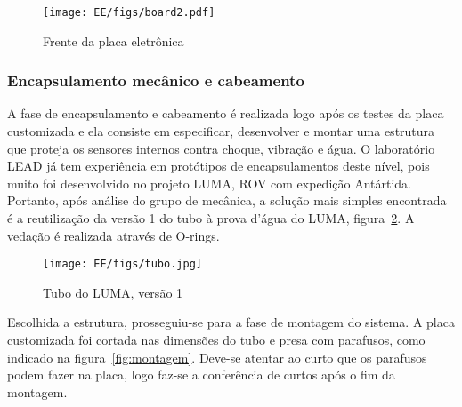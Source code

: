  \begin{figure}[H]
 \centering
 \texttt{[image: EE/figs/board2.pdf]}
 \caption{Frente da placa eletrônica}
 \label{fig:board2}
 \end{figure}

\subsubsection{Encapsulamento mecânico e cabeamento}
A fase de encapsulamento e cabeamento é realizada logo após os testes da placa
customizada e ela consiste em especificar, desenvolver e montar uma estrutura
que proteja os sensores internos contra choque, vibração e água. O laboratório
LEAD já tem experiência em protótipos de encapsulamentos deste nível, pois muito
foi desenvolvido no projeto LUMA, ROV com expedição Antártida. Portanto, após
análise do grupo de mecânica, a solução mais simples encontrada é a reutilização
da versão 1 do tubo à prova d'água do LUMA, figura~\ref{fig:tubo}. A vedação é
realizada através de O-rings. 
 \begin{figure}[H]
 \centering
 \texttt{[image: EE/figs/tubo.jpg]}
 \caption{Tubo do LUMA, versão 1}
 \label{fig:tubo}
 \end{figure}
 Escolhida a estrutura, prosseguiu-se para a fase de montagem do sistema. A
 placa customizada foi cortada nas dimensões do tubo e presa com parafusos,
 como indicado na figura~\ref{fig:montagem}. Deve-se atentar ao curto que os
 parafusos podem fazer na placa, logo faz-se a conferência de curtos após o fim
 da montagem.	
 
